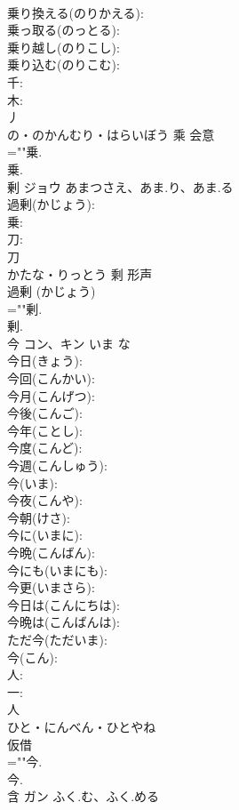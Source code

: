\documentclass[8pt]{extreport}
\begin{document}
\begin{CJK}{UTF8}{min}
\\	乗り換える(のりかえる): 
\\	乗っ取る(のっとる): 
\\	乗り越し(のりこし): 
\\	乗り込む(のりこむ): 
\\	千: 
\\	木: 
\\	丿	
\\	の・のかんむり・はらいぼう	乘	会意 
\\	=""乗.
\\	乗.
\\	剰	ジョウ	あまつさえ、あま.り、あま.る		
\\	過剰(かじょう): 
\\	乗: 
\\	刀: 
\\	刀	
\\	かたな・りっとう	剩	形声 
\\	過剰 (かじょう) 
\\	=""剰.
\\	剰.
\\	今	コン、キン	いま	な	
\\	今日(きょう): 
\\	今回(こんかい): 
\\	今月(こんげつ): 
\\	今後(こんご): 
\\	今年(ことし): 
\\	今度(こんど): 
\\	今週(こんしゅう): 
\\	今(いま): 
\\	今夜(こんや): 
\\	今朝(けさ): 
\\	今に(いまに): 
\\	今晩(こんばん): 
\\	今にも(いまにも): 
\\	今更(いまさら): 
\\	今日は(こんにちは): 
\\	今晩は(こんばんは): 
\\	ただ今(ただいま): 
\\	今(こん): 
\\	人: 
\\	一: 
\\	人	
\\	ひと・にんべん・ひとやね	
\\	仮借 
\\	=""今.
\\	今.
\\	含	ガン	ふく.む、ふく.める		

\end{CJK}
\end{document}
